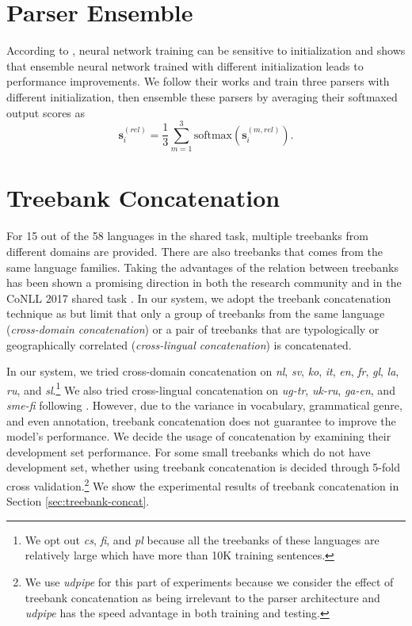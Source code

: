 \documentclass[11pt,a4paper]{article}
\begin{document}
\section{Parser Ensemble}\label{sec:ens}

According to \citet{reimers-gurevych:2017:EMNLP2017}, neural network training can
be sensitive to initialization and
\citet{DBLP:journals/corr/abs-1805-11224}  shows that ensemble
neural network trained with different initialization
leads to performance improvements.
We follow their works and train three parsers with different initialization,
then ensemble these parsers by averaging their softmaxed output scores as 
\[\mathbf{s}_i^{(rel)} = \frac{1}{3} \sum_{m=1}^{3} \text{softmax}(\mathbf{s}_i^{(m, rel)}).\]

\section{Treebank Concatenation}\label{sec:comb}

For 15 out of the 58 languages in the shared task,
multiple treebanks from different domains are provided.
There are also treebanks that comes from the same language families.
Taking the advantages of the relation between treebanks has been shown 
a promising direction in both the research community \cite{TACL892,guo-EtAl:2015:ACL-IJCNLP2,C16-1002}
and in the CoNLL 2017 shared task \cite{che-EtAl:2017:K17-3,bjorkelund-EtAl:2017:K17-3,shi-EtAl:2017:K17-3}.
In our system, we adopt the treebank concatenation technique as \cite{TACL892}
but limit that only a group of treebanks from the same language (\textit{cross-domain concatenation})
or a pair of treebanks that are typologically or geographically correlated (\textit{cross-lingual concatenation})
is concatenated.

In our system, we tried cross-domain concatenation on
\textit{nl}, \textit{sv}, \textit{ko}, \textit{it}, \textit{en}, \textit{fr},
\textit{gl}, \textit{la}, \textit{ru}, and \textit{sl}.\footnote{We opt out \textit{cs}, \textit{fi}, and \textit{pl} because all the treebanks of these languages are relatively large which have more than 10K training sentences.}
We also tried cross-lingual concatenation on \textit{ug-tr}, \textit{uk-ru}, \textit{ga-en},
and \textit{sme-fi} following \cite{che-EtAl:2017:K17-3}.
However, due to the variance in vocabulary, grammatical genre, and even annotation, 
treebank concatenation does not guarantee to improve the model's performance.
We decide the usage of concatenation by examining their development set performance.
For some small treebanks which do not have development set, whether using treebank concatenation
is decided through 5-fold cross validation.\footnote{We use \textit{udpipe}
	for this part of experiments
	because we consider the effect of treebank concatenation as
	being irrelevant to the parser architecture
	and \textit{udpipe} has the speed advantage in both training and testing.}
We show the experimental results of treebank concatenation
in Section \ref{sec:treebank-concat}.
\end{document}
